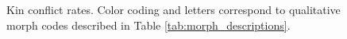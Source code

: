 \begin{figure}





\caption{ Kin conflict rates.
Color coding and letters correspond to qualitative morph codes described in Table \ref{tab:morph_descriptions}.}
\label{fig:conflict}

\end{figure}